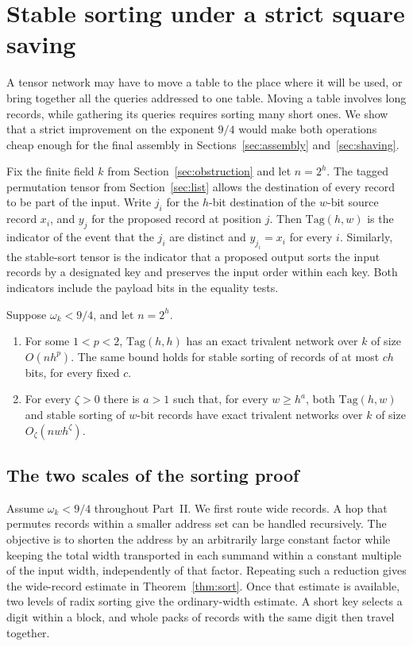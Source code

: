 \section{Stable sorting under a strict square saving}\label{sec:sorting}

A tensor network may have to move a table to the place where it will be
used, or bring together all the queries addressed to one table. Moving a table involves long records, while gathering its queries
requires sorting many short ones. We show
that a strict improvement on the exponent $9/4$ would make both operations
cheap enough for the final assembly in Sections~\ref{sec:assembly}
and~\ref{sec:shaving}.

Fix the finite field $k$ from Section~\ref{sec:obstruction} and let $n=2^h$.
The tagged permutation tensor from Section~\ref{sec:list} allows the
destination of every record to be part of the input. Write $j_i$ for
the $h$-bit destination of the $w$-bit source record $x_i$, and $y_j$
for the proposed record at position $j$. Then $\mathrm{Tag}(h,w)$ is the
indicator of the event that the $j_i$ are distinct and $y_{j_i}=x_i$
for every $i$. Similarly, the stable-sort tensor is the indicator that a
proposed output sorts the input records by a designated key and preserves
the input order within each key. Both indicators include the payload bits
in the equality tests.

\begin{theorem}\label{thm:sort}
Suppose $\omega_k<9/4$, and let $n=2^h$.
\begin{enumerate}
\item For some $1<p<2$, $\mathrm{Tag}(h,h)$ has an exact trivalent
network over $k$ of size $O(nh^p)$. The same bound holds for stable
sorting of records of at most $ch$ bits, for every fixed $c$.
\item For every $\zeta>0$ there is $a>1$ such that, for every $w\ge h^a$,
both $\mathrm{Tag}(h,w)$ and stable sorting of $w$-bit records have
exact trivalent networks over $k$ of size $O_\zeta(nw h^\zeta)$.
\end{enumerate}
\end{theorem}



\subsection{The two scales of the sorting proof}\label{sec:sort-road}

Assume $\omega_k<9/4$ throughout Part~II. We first route wide records.
A hop that permutes records within a smaller address set can be handled
recursively. The objective is to shorten the address by an arbitrarily
large constant factor while keeping the total width transported in each summand within a
constant multiple of the input width, independently of that factor. Repeating such
a reduction gives the wide-record estimate in Theorem~\ref{thm:sort}.
Once that estimate is available, two levels of radix sorting give the
ordinary-width estimate. A short key selects a digit within a block,
and whole packs of records with the same digit then travel together.

